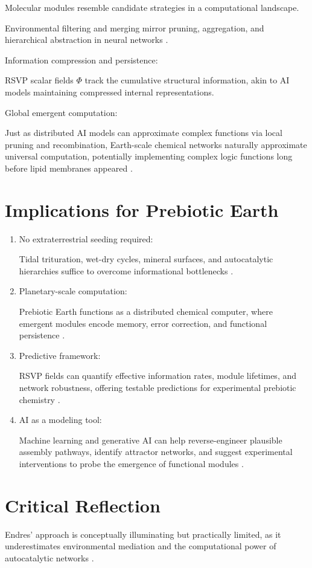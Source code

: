 \documentclass{book}
\begin{document}
Molecular modules resemble candidate strategies in a computational landscape.

Environmental filtering and merging mirror pruning, aggregation, and hierarchical abstraction in neural networks \citep{scalinghypothesis}.

Information compression and persistence:

RSVP scalar fields $\Phi$ track the cumulative structural information, akin to AI models maintaining compressed internal representations.

Global emergent computation:

Just as distributed AI models can approximate complex functions via local pruning and recombination, Earth-scale chemical networks naturally approximate universal computation, potentially implementing complex logic functions long before lipid membranes appeared \citep{day2024}.

\section{Implications for Prebiotic Earth}
\begin{enumerate}
\item No extraterrestrial seeding required:

Tidal trituration, wet-dry cycles, mineral surfaces, and autocatalytic hierarchies suffice to overcome informational bottlenecks \citep{plum2025}.
\item Planetary-scale computation:

Prebiotic Earth functions as a distributed chemical computer, where emergent modules encode memory, error correction, and functional persistence \citep{peng2020}.
\item Predictive framework:

RSVP fields can quantify effective information rates, module lifetimes, and network robustness, offering testable predictions for experimental prebiotic chemistry \citep{sokolskyi2024}.
\item AI as a modeling tool:

Machine learning and generative AI can help reverse-engineer plausible assembly pathways, identify attractor networks, and suggest experimental interventions to probe the emergence of functional modules \citep{scalinghypothesis}.
\end{enumerate}

\section{Critical Reflection}
Endres’ approach is conceptually illuminating but practically limited, as it underestimates environmental mediation and the computational power of autocatalytic networks \citep{endres2025}.
\end{document}
